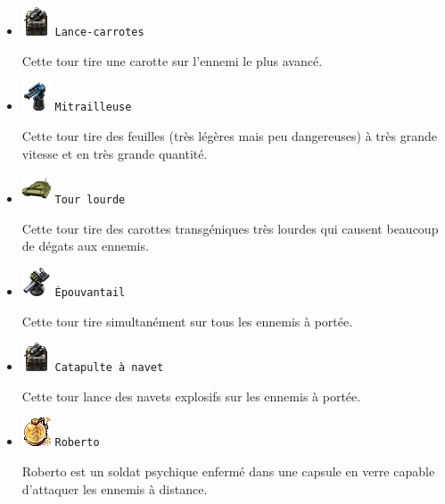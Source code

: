 \documentclass{article}
\begin{document}
\begin{itemize}

\item \includegraphics{base_tower.png} \texttt{Lance-carrotes}

Cette tour tire une carotte sur l'ennemi le plus avanc\'e.

\item \includegraphics{quick_tower.png} \texttt{Mitrailleuse}

Cette tour tire des feuilles (tr\`es l\'eg\`eres mais peu dangereuses) \`a
tr\`es grande vitesse et en tr\`es grande quantit\'e.

\item \includegraphics{tank.png} \texttt{Tour lourde}

Cette tour tire des carottes transg\'eniques tr\`es lourdes qui causent
beaucoup de d\'egats aux ennemis.

\item \includegraphics{heavy_tower.png} \texttt{\'Epouvantail}

Cette tour tire simultan\'ement sur tous les ennemis \`a port\'ee.

\item \includegraphics{base_tower.png} \texttt{Catapulte \`a navet}

Cette tour lance des navets explosifs sur les ennemis \`a port\'ee.

\item \includegraphics{roberto.png} \texttt{Roberto}

Roberto est un soldat psychique enferm\'e dans une capsule en verre capable
d'attaquer les ennemis \`a distance.


\end{itemize}
\end{document}
